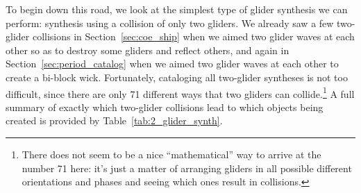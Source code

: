 To begin down this road, we look at the simplest type of glider synthesis we can perform: synthesis using a collision of only two gliders. We already saw a few two-glider collisions in Section~\ref{sec:coe_ship} when we aimed two glider waves at each other so as to destroy some gliders and reflect others, and again in Section~\ref{sec:period_catalog} when we aimed two glider waves at each other to create a bi-block wick. Fortunately, cataloging all two-glider syntheses is not too difficult, since there are only 71 different ways that two gliders can collide.\footnote{There does not seem to be a nice ``mathematical'' way to arrive at the number 71 here: it's just a matter of arranging gliders in all possible different orientations and phases and seeing which ones result in collisions.} A full summary of exactly which two-glider collisions lead to which objects being created is provided by Table~\ref{tab:2_glider_synth}.

